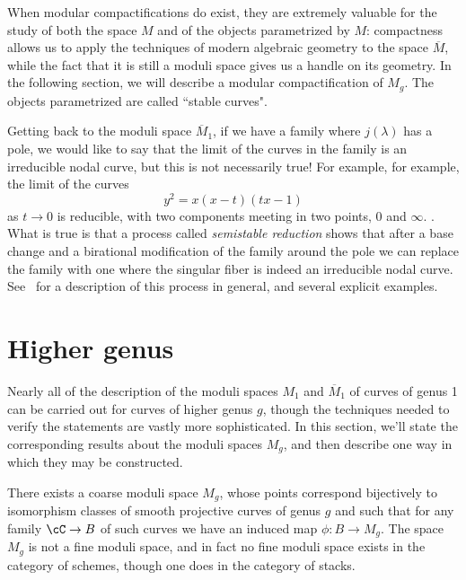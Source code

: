  When modular compactifications do exist, they are extremely valuable for the study of both the space $M$ and of the objects parametrized by $M$: compactness allows us to apply the techniques of modern algebraic geometry to the space $\overline M$, while the fact that it is still a moduli space gives us a handle on its geometry. In the following section, we will describe a modular compactification of $M_g$. The objects parametrized are called ``stable curves". 

Getting back to the moduli space $\overline M_1$, if we have a family where
$j(\lambda)$ has a pole, we would like to say that the limit of the curves in the family is an irreducible nodal curve,
but this is not necessarily true! For example, for example, the limit of the curves
$$
y^2 = x(x-t)(tx-1)
$$
as $t \to 0$ is reducible, with two components meeting in two points, 0 and $\infty$.
. What is true is that a process called \emph{semistable reduction} shows that after a base change and a birational
modification of the family around the pole we can replace the family with one where the singular fiber
is indeed an irreducible nodal curve. See~\cite{Harris-Morrison} for a description of this process in general, and several explicit examples.

\section{Higher genus}

Nearly all of the description of the moduli spaces $M_1$ and $\overline M_1$ of curves of genus 1 can be carried out for curves of higher genus $g$,  though the techniques needed to verify the statements are vastly more sophisticated. In this section, we'll state the corresponding results about the moduli spaces $M_g$, and then describe one way in which they may be constructed.

\begin{theorem}\label{moduli}
There exists a coarse moduli space $M_g$, whose points correspond bijectively to isomorphism classes of smooth projective curves of genus $g$ and such that for any family $\cC \to B$ of such curves we have an induced map $\phi : B \to M_g$. The space $M_g$ is not a fine moduli space, and in fact no fine moduli space exists in the category of schemes, though one does in the category of stacks.
\end{theorem}



